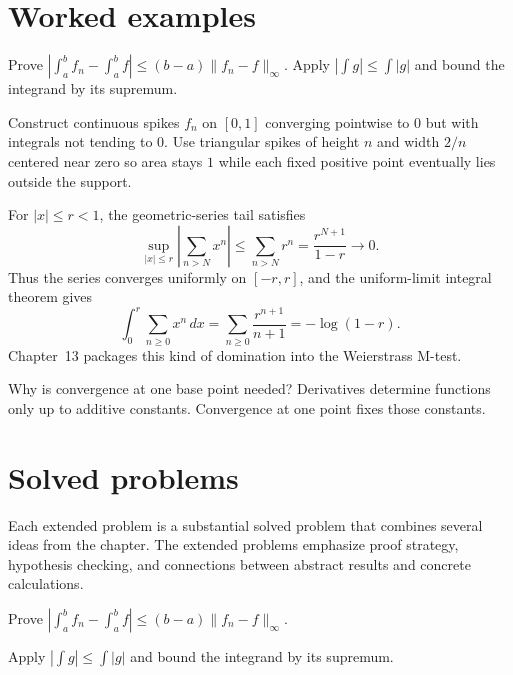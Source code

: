 \section{Worked examples}

\begin{example}\label{ex:ii12-worked-01}
Prove $|\int_a^b f_n-\int_a^b f|\le(b-a)\|f_n-f\|_\infty$. Apply $|\int g|\le\int|g|$ and bound the integrand by its supremum.
\end{example}

\begin{example}\label{ex:ii12-worked-02}
Construct continuous spikes $f_n$ on $[0,1]$ converging pointwise to $0$ but with integrals not tending to $0$. Use triangular spikes of height $n$ and width $2/n$ centered near zero so area stays $1$ while each fixed positive point eventually lies outside the support.
\end{example}

\begin{example}\label{ex:ii12-worked-03}
For $|x|\le r<1$, the geometric-series tail satisfies
\[
\sup_{|x|\le r}\left|\sum_{n>N}x^n\right|
\le\sum_{n>N}r^n=\frac{r^{N+1}}{1-r}\to0.
\]
Thus the series converges uniformly on $[-r,r]$, and the uniform-limit integral theorem gives
\[
\int_0^r\sum_{n\ge0}x^n\,dx
=\sum_{n\ge0}\frac{r^{n+1}}{n+1}
=-\log(1-r).
\]
Chapter~13 packages this kind of domination into the Weierstrass M-test.
\end{example}

\begin{example}\label{ex:ii12-worked-04}
Why is convergence at one base point needed? Derivatives determine functions only up to additive constants. Convergence at one point fixes those constants.
\end{example}

\section{Solved problems}
Each extended problem is a substantial solved problem that combines several ideas from the chapter. The extended problems emphasize proof strategy, hypothesis checking, and connections between abstract results and concrete calculations.

\begin{problem}\label{prob:ii12-problem-01}
Prove $|\int_a^b f_n-\int_a^b f|\le(b-a)\|f_n-f\|_\infty$.
\end{problem}
\begin{solution}
Apply $|\int g|\le\int|g|$ and bound the integrand by its supremum.
\end{solution}

